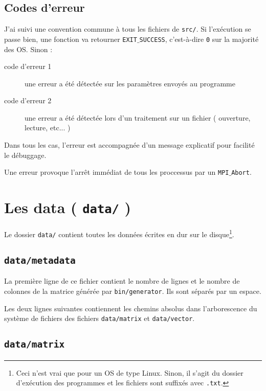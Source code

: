 \documentclass[a4paper,10pt]{article}
\begin{document}
\subsection{Codes d'erreur}

J'ai suivi une convention commune à tous les fichiers de \texttt{src/}. Si l'exécution se passe bien, une fonction va retourner \texttt{EXIT$\_$SUCCESS}, c'est-à-dire \texttt{0} sur la majorité des OS. Sinon :

\begin{description}
  \item[code d'erreur 1]$ $\\une erreur a été détectée sur les paramètres envoyés au programme
  \item[code d'erreur 2]$ $\\une erreur a été détectée lors d'un traitement sur un fichier ( ouverture, lecture, etc... ) 
\end{description}

Dans tous les cas, l'erreur est accompagnée d'un message explicatif pour facilité le débuggage.

\bigskip

Une erreur provoque l'arrêt immédiat de tous les proccessus par un \texttt{MPI$\_$Abort}.

\section{Les data ( \texttt{data/} )}

Le dossier \texttt{data/} contient toutes les données écrites en dur sur le disque\footnote{Ceci n'est vrai que pour un OS de type Linux. Sinon, il s'agit du dossier d'exécution des programmes et les fichiers sont suffixés avec \texttt{.txt}.}.

\subsection{\texttt{data/metadata}}

La première ligne de ce fichier contient le nombre de lignes et le nombre de colonnes de la matrice générée par \texttt{bin/generator}. Ils sont séparés par un espace.

\bigskip

Les deux lignes suivantes contiennent les chemins absolus dans l'arborescence du système de fichiers des fichiers \texttt{data/matrix} et \texttt{data/vector}.

\subsection{\texttt{data/matrix}}
\end{document}
